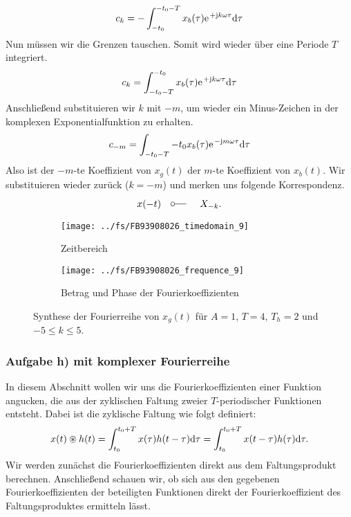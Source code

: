 \documentclass[11pt,a4paper,DIV=12]{scrartcl}
\begin{document}
%
\begin{align}
	c_k=-\int_{-t_0}^{-t_0-T}x_{b}(\tau)\e^{+\im k \omega \tau}\diff \tau
\end{align}
%
Nun müssen wir die Grenzen tauschen. Somit wird wieder über eine Periode $T$
integriert.
%
\begin{align}
	c_k=\int_{-t_0-T}^{-t_0}x_{b}(\tau)\e^{+\im k \omega \tau}\diff \tau
\end{align}
%
Anschließend substituieren wir $k$ mit $-m$, um wieder ein Minus-Zeichen in der
komplexen Exponentialfunktion zu erhalten.
%
\begin{align}
	c_{-m}=\int_{-t_0-T}{-t_0}x_{b}(\tau)\e^{-\im m \omega \tau}\diff \tau
\end{align}
%
Also ist der $-m$-te Koeffizient von $x_{g}(t)$ der $m$-te Koeffizient von
$x_{b}(t)$.
%
Wir substituieren wieder zurück ($k=-m$) und merken uns folgende Korrespondenz.
\begin{align}
	x(-t)\quad\fourier\quad X_{-k}.
\end{align}
\begin{figure}
	\centering
	\begin{subfigure}{\textwidth}
		\texttt{[image: ../fs/FB93908026\_timedomain\_9]}
		\caption{Zeitbereich}
	\end{subfigure}
	\begin{subfigure}{\textwidth}
		\texttt{[image: ../fs/FB93908026\_frequence\_9]}
		\caption{Betrag und Phase der Fourierkoeffizienten}
	\end{subfigure}
	\caption{Synthese der Fourierreihe von $x_g(t)$ für $A=1$, $T=4$, $T_h=2$ und
		$-5\leq k\leq5$.}
\end{figure}
\newpage
\subsubsection{Aufgabe h) mit komplexer Fourierreihe}
In diesem Abschnitt wollen wir uns die Fourierkoeffizienten einer Funktion
angucken, die aus der zyklischen Faltung zweier $T$-periodischer Funktionen
entsteht.
%
Dabei ist die zyklische Faltung wie folgt definiert:
%
\begin{align}
	x(t)\circledast h(t)=\int_{t_0}^{t_0+T}x(\tau)h(t-\tau)\mathrm{d} \tau=\int_{t_0}^{t_0+T}x(t-\tau)h(\tau)\mathrm{d} \tau.
\end{align}
%
Wir werden zunächst die Fourierkoeffizienten direkt aus dem Faltungsprodukt
berechnen.
%
Anschließend schauen wir, ob sich aus den gegebenen Fourierkoeffizienten der
beteiligten Funktionen direkt der Fourierkoeffizient des Faltungsproduktes
ermitteln lässt.
\end{document}
